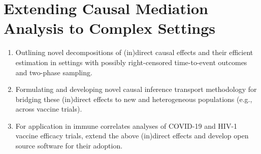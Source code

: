 \section{Extending Causal Mediation Analysis to Complex Settings}

\begin{enumerate}[label=(\alph*)]
  \itemsep0.2pt
  \item Outlining novel decompositions of (in)direct causal effects and their
    efficient estimation in settings with possibly right-censored time-to-event
    outcomes and two-phase sampling.
  \item Formulating and developing novel causal inference transport methodology
    for bridging these (in)direct effects to new and heterogeneous populations
    (e.g., across vaccine trials).
  \item For application in immune correlates analyses of COVID-19 and HIV-1
     vaccine efficacy trials, extend the above (in)direct effects and develop
     open source software for their adoption.
\end{enumerate}

